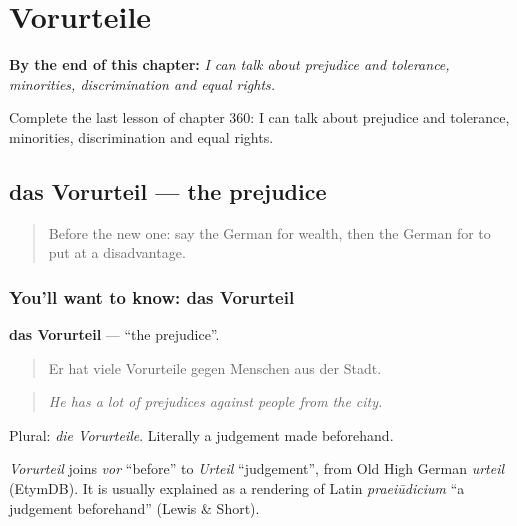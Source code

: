 
\chapter{Vorurteile}
\label{ch:ge-vorurteile}

\begin{chapteropening}
\textbf{By the end of this chapter:} \emph{I can talk about prejudice and tolerance, minorities, discrimination and equal rights.}

Complete the last lesson of chapter 360: I can talk about prejudice and tolerance, minorities, discrimination and equal rights.
\end{chapteropening}

\section[das Vorurteil]{das Vorurteil — the prejudice}

\label{lesson:GE-C360-vorurteil}



\begin{quote}
Before the new one: say the German for wealth, then the German for to put at a disadvantage.
\end{quote}

\subsection*{You'll want to know: das Vorurteil}
\textbf{das Vorurteil} — \textquotedblleft{}the prejudice\textquotedblright{}.

\begin{quote}
Er hat viele Vorurteile gegen Menschen aus der Stadt.
\end{quote}

\begin{quote}
\emph{He has a lot of prejudices against people from the city.}
\end{quote}

Plural: \emph{die Vorurteile}. Literally a judgement made beforehand.

\begin{cousinweb}
\emph{Vorurteil} joins \emph{vor} \textquotedblleft{}before\textquotedblright{} to \emph{Urteil} \textquotedblleft{}judgement\textquotedblright{}, from Old High German \emph{urteil} (EtymDB). It is usually explained as a rendering of Latin \emph{praeiūdicium} \textquotedblleft{}a judgement beforehand\textquotedblright{} (Lewis \& Short).
\end{cousinweb}

